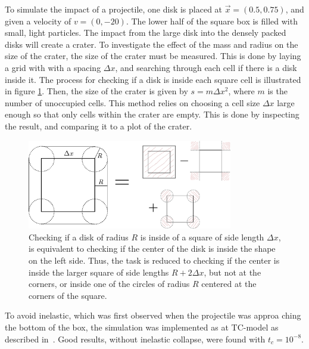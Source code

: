 \documentclass{article}
\begin{document}
            To simulate the impact of a projectile, one disk is placed at $\vec x = (0.5, 0.75)$, and given a velocity of $v = (0, -20)$. The lower half of the square box is filled with small, light particles. The impact from the large disk into the densely packed disks will create a crater. To investigate the effect of the mass and radius on the size of the crater, the size of the crater must be measured. This is done by laying a grid with with a spacing $\Delta x$, and searching through each cell if there is a disk inside it. The process for checking if a disk is inside each square cell is illustrated in figure \ref{cheack if disk is inside}. Then, the size of the crater is given by $s = m \Delta x^2$, where $m$ is the number of unoccupied cells. This method relies on choosing a cell size $\Delta x$ large enough so that only cells within the crater are empty. This is done by inspecting the result, and comparing it to a plot of the crater.

            \begin{figure}[ht]
                \centering
                \includegraphics[width=0.8\textwidth]{figure.pdf}
                \caption{Checking if a disk of radius $R$ is inside of a square of side length $\Delta x$, is equivalent to checking if the center of the disk is inside the shape on the left side. Thus, the task is reduced to checking if the center is inside the larger square of side lengths $R + 2 \Delta x$, but not at the corners, or inside one of the circles of radius $R$ centered at the corners of the square.}
                \label{cheack if disk is inside}
            \end{figure}

            To avoid inelastic, which was first observed when the projectile was approa ching the bottom of the box, the simulation was implemented as at TC-model as described in~\cite{TC}. Good results, without inelastic collapse, were found with $t_c = 10^{-8}$.
\end{document}
